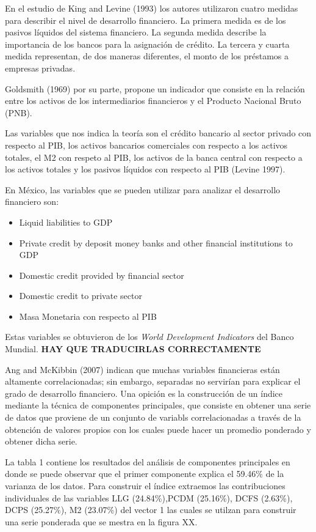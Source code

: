 \documentclass[]{AEA}
\begin{document}
En el estudio de King and Levine (1993) los autores utilizaron cuatro
medidas para describir el nivel de desarrollo financiero. La primera
medida es de los pasivos líquidos del sistema financiero. La segunda
medida describe la importancia de los bancos para la asignación de
crédito. La tercera y cuarta medida representan, de dos maneras
diferentes, el monto de los préstamos a empresas privadas.

Goldsmith (1969) por su parte, propone un indicador que consiste en la
relación entre los activos de los intermediarios financieros y el
Producto Nacional Bruto (PNB).

Las variables que nos indica la teoría son el crédito bancario al sector
privado con respecto al PIB, los activos bancarios comerciales con
respecto a los activos totales, el M2 con respeto al PIB, los activos de
la banca central con respecto a los activos totales y los pasivos
líquidos con respecto al PIB (Levine 1997).

En México, las variables que se pueden utilizar para analizar el
desarrollo financiero son:

\begin{itemize}
\item Liquid liabilities to GDP %
\item Private credit by deposit money banks and other financial institutions to GDP %
\item Domestic credit provided by financial sector %
\item Domestic credit to private sector %
\item Masa Monetaria con respecto al PIB
\end{itemize}

Estas variables se obtuvieron de los \emph{World Development Indicators}
del Banco Mundial. \textbf{HAY QUE TRADUCIRLAS CORRECTAMENTE}

Ang and McKibbin (2007) indican que muchas variables financieras están
altamente correlacionadas; sin embargo, separadas no servirían para
explicar el grado de desarrollo financiero. Una opición es la
construcción de un índice mediante la técnica de componentes
principales, que consiste en obtener una serie de datos que proviene de
un conjunto de variabls correlacionadas a través de la obtención de
valores propios con los cuales puede hacer un promedio ponderado y
obtener dicha serie.

La tabla 1 contiene los resultados del análisis de componentes
principales en donde se puede observar que el primer componente explica
el 59.46\% de la varianza de los datos. Para construir el índice
extraemos las contribuciones individuales de las variables LLG
(24.84\%),PCDM (25.16\%), DCFS (2.63\%), DCPS (25.27\%), M2 (23.07\%)
del vector 1 las cuales se utilzan para construir una serie ponderada
que se mestra en la figura XX.
\end{document}
